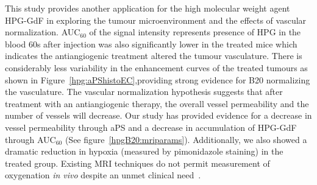 This study provides another application for the high molecular weight agent \acs{HPG-GdF} in exploring the tumour microenvironment and the effects of vascular normalization.
\acs{AUC}$_{60}$ of the signal intensity represents presence of HPG in the blood 60s after injection was also significantly lower in the treated mice which indicates the antiangiogenic treatment altered the tumour vasculature.
There is considerably less variability in the enhancement curves of the treated tumours as shown in Figure~\ref{hpg:aPShistoEC},providing strong evidence for B20 normalizing the vasculature.
The vascular normalization hypothesis suggests that after treatment with an antiangiogenic therapy, the overall vessel permeability and the number of vessels will decrease.
Our study has provided evidence for a decrease in vessel permeability through \acs{aPS} and a decrease in accumulation of \acs{HPG-GdF} through \acs{AUC}$_{60}$ (See figure~\ref{hpgB20:mriparams}).
Additionally, we also showed a dramatic reduction in hypoxia (measured by pimonidazole staining) in the treated group. 
Existing MRI techniques do not permit measurement of oxygenation \emph{in vivo} despite an unmet clinical need~\cite{Horsman:2012kw}.

